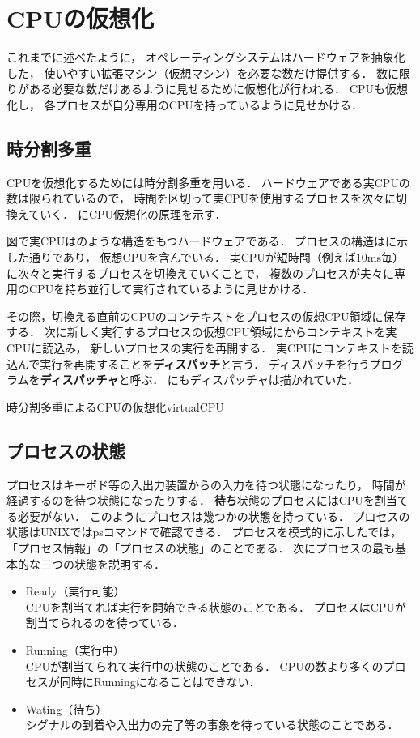 \chapter{CPUの仮想化}
これまでに述べたように，
オペレーティングシステムはハードウェアを抽象化した，
使いやすい拡張マシン（仮想マシン）を必要な数だけ提供する．
数に限りがある必要な数だけあるように見せるために仮想化が行われる．
CPUも仮想化し，
各プロセスが自分専用のCPUを持っているように見せかける．

\section{時分割多重}
CPUを仮想化するためには時分割多重を用いる．
ハードウェアである実CPUの数は限られているので，
時間を区切って実CPUを使用するプロセスを次々に切換えていく．
にCPU仮想化の原理を示す．

図で実CPUはのような構造をもつハードウェアである．
プロセスの構造はに示した通りであり，
仮想CPUを含んでいる．
実CPUが短時間（例えば10ms毎）に次々と実行するプロセスを切換えていくことで，
複数のプロセスが夫々に専用のCPUを持ち並行して実行されているように見せかける．

その際，切換える直前のCPUのコンテキストをプロセスの仮想CPU領域に保存する．
次に新しく実行するプロセスの仮想CPU領域にからコンテキストを実CPUに読込み，
新しいプロセスの実行を再開する．
実CPUにコンテキストを読込んで実行を再開することを{\bf ディスパッチ}と言う．
ディスパッチを行うプログラムを{\bf ディスパッチャ}と呼ぶ．
にもディスパッチャは描かれていた．

{時分割多重によるCPUの仮想化}{virtualCPU}

\section{プロセスの状態}
プロセスはキーボド等の入出力装置からの入力を待つ状態になったり，
時間が経過するのを待つ状態になったりする．
{\bf 待ち}状態のプロセスにはCPUを割当てる必要がない．
このようにプロセスは幾つかの状態を持っている．
プロセスの状態はUNIXではpsコマンドで確認できる．
プロセスを模式的に示したでは，
「プロセス情報」の「プロセスの状態」のことである．
次にプロセスの最も基本的な三つの状態を説明する．

\begin{itemize}
\item Ready（実行可能） \\
CPUを割当てれば実行を開始できる状態のことである．
プロセスはCPUが割当てられるのを待っている．
\item Running（実行中） \\
CPUが割当てられて実行中の状態のことである．
CPUの数より多くのプロセスが同時にRunningになることはできない．
\item Wating（待ち） \\
シグナルの到着や入出力の完了等の事象を待っている状態のことである．
\end{itemize}

